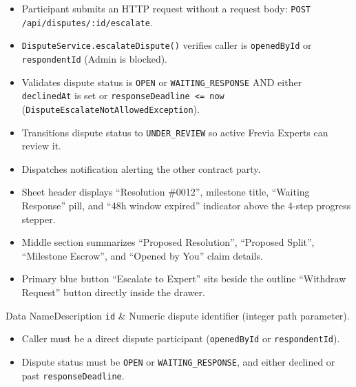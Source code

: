 \begin{itemize}[leftmargin=1.6em,topsep=3pt,itemsep=2pt,parsep=0pt,label=$\bullet$]
      \item Participant submits an HTTP request without a request body: \texttt{POST /\allowbreak{}api/\allowbreak{}disputes/\allowbreak{}:\allowbreak{}id/\allowbreak{}escalate}.
      \item \texttt{DisputeService.escalateDispute()} verifies caller is \texttt{openedById} or \texttt{respondentId} (Admin is blocked).
      \item Validates dispute status is \texttt{OPEN} or \texttt{WAITING\_RESPONSE} AND either \texttt{declinedAt} is set or \texttt{responseDeadline <= now} (\texttt{DisputeEscalateNotAllowedException}).
      \item Transitions dispute status to \texttt{UNDER\_REVIEW} so active Frevia Experts can review it.
      \item Dispatches notification alerting the other contract party.
\end{itemize}

\begin{itemize}[leftmargin=1.6em,topsep=3pt,itemsep=2pt,parsep=0pt,label=$\bullet$]
      \item Sheet header displays ``Resolution \#0012'', milestone title, ``Waiting Response'' pill, and ``48h window expired'' indicator above the 4-step progress stepper.
      \item Middle section summarizes ``Proposed Resolution'', ``Proposed Split'', ``Milestone Escrow'', and ``Opened by You'' claim details.
      \item Primary blue button ``Escalate to Expert'' sits beside the outline ``Withdraw Request'' button directly inside the drawer.
\end{itemize}


\begin{specdatatable}{Data Name}{Description}
      \texttt{id} & Numeric dispute identifier (integer path parameter).\\ \hline
\end{specdatatable}

\begin{itemize}[leftmargin=1.6em,topsep=3pt,itemsep=2pt,parsep=0pt,label=$\bullet$]
      \item Caller must be a direct dispute participant (\texttt{openedById} or \texttt{respondentId}).
      \item Dispute status must be \texttt{OPEN} or \texttt{WAITING\_RESPONSE}, and either declined or past \texttt{responseDeadline}.
\end{itemize}

